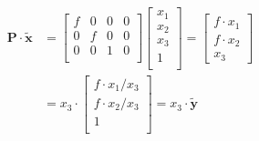\begin{equation*}
\begin{split}
\mathbf{P}\cdot\mathbf{\tilde{x}}&=
\begin{bmatrix}
f & 0 & 0 & 0\\
0 & f & 0 & 0\\
0 & 0 & 1 & 0\\
\end{bmatrix}\begin{bmatrix}x_1\\x_2\\x_3\\1\\\end{bmatrix}
=\begin{bmatrix}
f\cdot x_1\\
f\cdot x_2\\
x_3
\end{bmatrix}\\
&=
x_3\cdot\begin{bmatrix}
f\cdot x_1/x_3\\
f\cdot x_2/x_3\\
1\\
\end{bmatrix}
=x_3\cdot\mathbf{\tilde{y}}
\end{split}
\end{equation*} 

